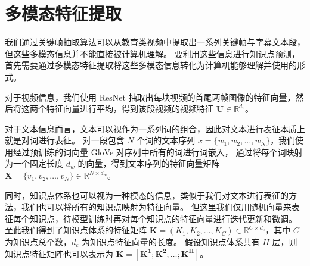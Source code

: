 \section{多模态特征提取}
    我们通过关键帧抽取算法可以从教育类视频中提取出一系列关键帧与字幕文本段，但这些多模态信息并不能直接被计算机理解。
    要利用这些信息进行知识点预测，首先需要通过多模态特征提取将这些多模态信息转化为计算机能够理解并使用的形式。

    对于视频信息，我们使用 ResNet\cite{He2016DeepRL} 抽取出每块视频的首尾两帧图像的特征向量，然后将这两个特征向量进行平均，得到该段视频的视频特征 $\boldsymbol{U} \in \mathbb{R}^{d_v}$。

    对于文本信息而言，文本可以视作为一系列词的组合，因此对文本进行表征本质上就是对词进行表征。
    对一段包含 $N$ 个词的文本序列 $x = \{w_1, w_2, \dots, w_N\}$，我们使用经过预训练的词向量 GloVe\cite{Pennington2014GloVeGV} 对序列中所有的词进行词嵌入，
    通过将每个词映射为一个固定长度 $d_w$ 的向量，得到文本序列的特征向量矩阵 $\boldsymbol{X} = \{v_1, v_2, \dots, v_N\} \in \mathbb{R}^{N \times d_{w}}$。

    同时，知识点体系也可以视为一种模态的信息，类似于我们对文本进行表征的方法，我们也可以将所有的知识点映射为特征向量。
    但这里我们仅用随机向量来表征每个知识点，待模型训练时再对每个知识点的特征向量进行迭代更新和微调。
    至此我们得到了知识点体系的特征矩阵 $\boldsymbol{K} = \left(K_1, K_2, \dots, K_C\right) \in \mathbb{R}^{C \times d_c}$，其中 $C$ 为知识点总个数，$d_c$ 为知识点特征向量的长度。
    假设知识点体系共有 $H$ 层，则知识点特征矩阵也可以表示为 $\boldsymbol{K} = \left[\boldsymbol{K^1}; \boldsymbol{K^2}; \dots; \boldsymbol{K^H}\right]$。


